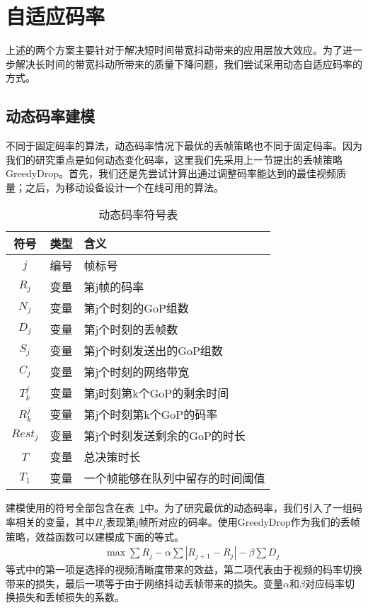 \section{自适应码率}
上述的两个方案主要针对于解决短时间带宽抖动带来的应用层放大效应。为了进一步解决长时间的带宽抖动所带来的质量下降问题，我们尝试采用动态自适应码率的方式。
\subsection{动态码率建模}
不同于固定码率的算法，动态码率情况下最优的丢帧策略也不同于固定码率。因为我们的研究重点是如何动态变化码率，这里我们先采用上一节提出的丢帧策略GreedyDrop。首先，我们还是先尝试计算出通过调整码率能达到的最佳视频质量；之后，为移动设备设计一个在线可用的算法。

\begin{table}[tb]
\centering
\caption{动态码率符号表}
\label{vbr_vbr}
{\setlength{\tabcolsep}{3pt}
\begin{tabular}{|c|c|l|}
\hline
\textbf{符号} & \textbf{类型} & \textbf{含义}                      \\ \hline
$j$               & 编号         & 帧标号                            \\ \hline
$R_j$             & 变量      & 第j帧的码率 \\ \hline
$N_j$             & 变量      & 第j个时刻的GoP组数     \\ \hline
$D_j$             & 变量      & 第j个时刻的丢帧数  \\ \hline
$S_j$             & 变量   & 第j个时刻发送出的GoP组数 \\ \hline
$C_j$              & 变量         & 第j个时刻的网络带宽           \\ \hline
$T_k^j$               & 变量         & 第j时刻第k个GoP的剩余时间  \\ \hline
$R_k^j$            & 变量         & 第j个时刻第k个GoP的码率  \\ \hline
$Rest_j$       & 变量 & 第j个时刻发送剩余的GoP的时长 \\ \hline
$T$               & 变量         & 总决策时长                       \\ \hline
$T_1$               &变量          & 一个帧能够在队列中留存的时间阈值 \\
\hline\end{tabular}}
\end{table}

建模使用的符号全部包含在表~\ref{vbr_vbr}中。为了研究最优的动态码率，我们引入了一组码率相关的变量，其中$R_j$表现第j帧所对应的码率。使用GreedyDrop作为我们的丢帧策略，效益函数可以建模成下面的等式。
\begin{eqnarray}
  && \max \sum R_j- \alpha\sum|R_{j+1}-R_j|-\beta\sum D_j
\end{eqnarray}
等式中的第一项是选择的视频清晰度带来的效益，第二项代表由于视频的码率切换带来的损失，最后一项等于由于网络抖动丢帧带来的损失。变量$\alpha$和$\beta$对应码率切换损失和丢帧损失的系数。

